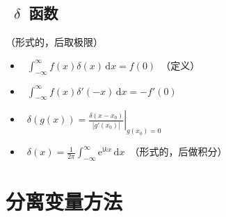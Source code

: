 \documentclass[12pt,a4paper]{article}
\newcommand\diff{\,\mathrm{d}}
\renewcommand{\[}{\ $\displaystyle}
\renewcommand{\]}{$\ }%
\newcommand\mi{\mathrm{i}}
\newcommand\e{\mathrm{e}}
\begin{document}
	 \subsection[delta~函数]{\[\delta\]函数}
	 （形式的，后取极限）
	 	\begin{itemize}
	 	  \item \[\int_{-\infty}^{\infty} f(x)\delta(x)\diff x = f(0)\]（定义）
	 	  \item \[\int_{-\infty}^{\infty}f(x)\delta'(-x)\diff x = -f'(0)\]
	 	  \item \[\delta(g(x)) = \left.\frac{\delta(x-x_0)}{|g'(x_0)|}\right|_{g(x_0) = 0}\]
	 	  \item \[\delta(x) = \frac{1}{2\pi}\int_{-\infty}^\infty \e^{\mi kx}\diff x\]（形式的，后做积分）
	 	\end{itemize}
	
\section{分离变量方法}
\end{document}

